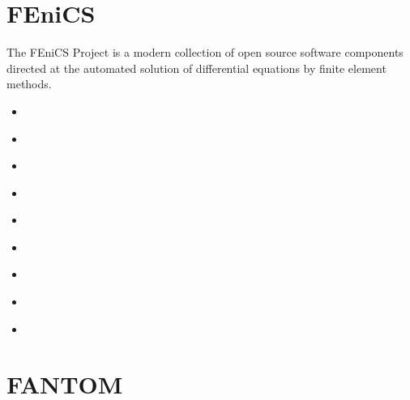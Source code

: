 
\section{FEniCS} 

The FEniCS Project is a modern collection of open source
software components directed at the automated solution of
differential equations by finite element methods.

\begin{small}
\begin{itemize}
\item[2016] \textcite{rogj16}
\item[\twothousandthirteen]  \textcite{vyrc13}
\item[\twothousandfourteen]  \textcite{alrk14}
\item[\twothousandseventeen] \textcite{jidb17}
\item[\twothousandtwenty]    \textcite{resi20}
\item[\twothousandtwentyone] \textcite{josv21}
\item[2024] \textcite{lipb24}
\item[2025] \textcite{kict25}
\item[2026] \textcite{lejt26}
\end{itemize}
\end{small}


\section{FANTOM}

